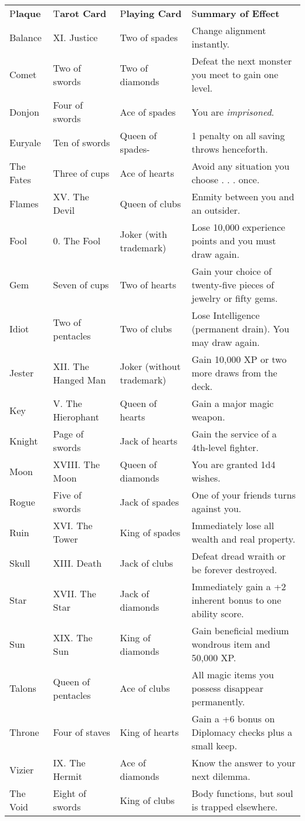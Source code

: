 \documentclass{article}
\begin{document}
\vspace{12pt}
\begin{tabular}{|>{\raggedright}p{29pt}|>{\raggedright}p{59pt}|>{\raggedright}p{68pt}|>{\raggedright}p{145pt}|}
\hline
\multicolumn{4}{|p{302pt}|}{\section*{D\textbf{eck of Many Things}}}\tabularnewline
\hline
P\textbf{laque} & T\textbf{arot Card} & P\textbf{laying Card} & S\textbf{ummary 
of Effect}\tabularnewline
\hline
Balance & XI. Justice & Two of spades & Change alignment instantly.\tabularnewline
\hline
Comet & Two of swords & Two of diamonds & Defeat the next monster you meet to gain 
one level.\tabularnewline
\hline
Donjon & Four of swords & Ace of spades & You are \textit{imprisoned}.\tabularnewline
\hline
Euryale & Ten of swords & Queen of spades- & 1 penalty on all saving throws henceforth.\tabularnewline
\hline
The Fates & Three of cups & Ace of hearts & Avoid any situation you choose . . 
. once.\tabularnewline
\hline
Flames & XV. The Devil & Queen of clubs & Enmity between you and an outsider.\tabularnewline
\hline
Fool & 0. The Fool & Joker (with trademark) & Lose 10,000 experience points and 
you must draw again.\tabularnewline
\hline
Gem & Seven of cups & Two of hearts & Gain your choice of twenty-five pieces of 
jewelry or fifty gems.\tabularnewline
\hline
Idiot & Two of pentacles & Two of clubs & Lose Intelligence (permanent drain). 
You may draw again.\tabularnewline
\hline
Jester & XII. The Hanged Man & Joker (without trademark) & Gain 10,000 XP or two 
more draws from the deck.\tabularnewline
\hline
Key & V. The Hierophant & Queen of hearts & Gain a major magic weapon.\tabularnewline
\hline
Knight & Page of swords & Jack of hearts & Gain the service of a 4th-level fighter.\tabularnewline
\hline
Moon & XVIII. The Moon & Queen of diamonds & You are granted 1d4 wishes.\tabularnewline
\hline
Rogue & Five of swords & Jack of spades & One of your friends turns against you.\tabularnewline
\hline
Ruin & XVI. The Tower & King of spades & Immediately lose all wealth and real property.\tabularnewline
\hline
Skull & XIII. Death & Jack of clubs & Defeat dread wraith or be forever destroyed.\tabularnewline
\hline
Star & XVII. The Star & Jack of diamonds & Immediately gain a +2 inherent bonus 
to one ability score.\tabularnewline
\hline
Sun & XIX. The Sun & King of diamonds & Gain beneficial medium wondrous item and 
50,000 XP.\tabularnewline
\hline
Talons & Queen of pentacles & Ace of clubs & All magic items you possess disappear 
permanently.\tabularnewline
\hline
Throne & Four of staves & King of hearts & Gain a +6 bonus on Diplomacy checks 
plus a small keep.\tabularnewline
\hline
Vizier & IX. The Hermit & Ace of diamonds & Know the answer to your next dilemma.\tabularnewline
\hline
The Void & Eight of swords & King of clubs & Body functions, but soul is trapped 
elsewhere.\tabularnewline
\hline
\end{tabular}
\end{document}
